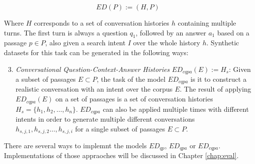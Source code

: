 \begin{equation}
    ED(P) := (H, P)
    \label{eq:task_conversation}
\end{equation}

Where $H$ corresponds to a set of conversation histories $h$ containing multiple turns. The first turn is always a question $q_1$, followed by an answer $a_1$ based on a passage $p \in P$, also given a search intent $I$ over the whole history $h$. Synthetic datasets for this task can be generated in the following ways:

\begin{enumerate}
    \setcounter{enumi}{2} %
    \item \textit{Conversational Question-Context-Answer Histories} $ED_{cqpa}(E) := H_s$: Given a subset of passages $E \subset P$, the task of the model $ED_{cqpa}$ is it to construct a realistic conversation with an intent over the corpus $E$. The result of applying $ED_{cqpa}(E)$ on a set of passages is a set of conversation histories $H_s = \{h_1, h_2, \dots, h_n\}$. $ED_{cqpa}$ can also be applied multiple times with different intents in order to generate multiple different conversations $h_{s,j,1}, h_{s,j,2} \dots , h_{s,j,i}$ for a single subset of passages $E \subset P$.
\end{enumerate}

There are several ways to implemnt the models $ED_{qp}$, $ED_{qpa}$ or $ED_{cqpa}$. Implementations of those appraoches will be discussed in Chapter \ref{chap:eval}. 



    

